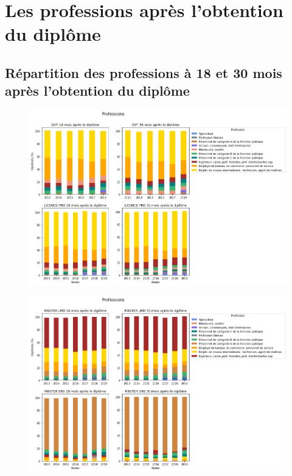 \documentclass[12pt, a4paper, titlepage, table]{article}
\begin{document}
\section{Les professions après l'obtention du diplôme}

	\subsection{Répartition des professions à 18 et 30 mois après l'obtention du diplôme}
		\begin{figure}[H]
			\centering
			\includegraphics[width=1\textwidth]{../graphs/repartition_professions_situation_1.png}
		\end{figure}
	
		\begin{figure}[H]
			\centering
			\includegraphics[width=1\textwidth]{../graphs/repartition_professions_situation_2.png}
		\end{figure}
\end{document}
